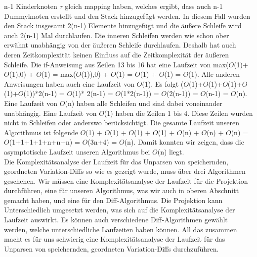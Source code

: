 n-1 Kinderknoten $\tau$ gleich mapping haben, welches ergibt, dass auch n-1 Dummyknoten erstellt und den Stack hinzugefügt werden. In diesem Fall wurden den Stack insgesamt 2(n-1) Elemente hinzugefügt und die äußere Schleife wird auch 2(n-1) Mal durchlaufen. Die inneren Schleifen werden wie schon ober erwähnt unabhängig von der äußeren Schleife durchlaufen. Deshalb hat auch deren Zeitkomplexität keinen Einfluss auf die Zeitkomplexität der äußeren Schleife. Die if-Anweisung aus Zeilen 13 bis 16 hat eine Laufzeit von max($O$(1)+$O$(1),0) + $O$(1) = max($O$(1)),0) + $O$(1) = $O$(1) + $O$(1) = $O$(1). Alle anderen Anweisungen haben auch eine Laufzeit von $O$(1). Es folgt ($O$(1)+$O$(1)+$O$(1)+$O$(1)+$O$(1))*2(n-1) = $O$(1)* 2(n-1) = $O$(1*2(n-1)) = $O$(2(n-1)) = $O$(n-1) = $O$(n). Eine Laufzeit von $O$(n) haben alle Schleifen und sind dabei voneinander unabhängig. Eine Laufzeit von $O$(1) haben die Zeilen 1 bis 4. Diese Zeilen wurden nicht in Schleifen oder anderswo berücksichtigt. Die gesamte Laufzeit unseren Algorithmus ist folgende $O$(1) + $O$(1) + $O$(1) + $O$(1) + $O$(n) + $O$(n) + $O$(n) = $O$(1+1+1+1+n+n+n) = $O$(3n+4) = $O$(n). Damit konnten wir zeigen, dass die asymptotische Laufzeit unseren Algorithmus bei $O$(n) liegt.\\

Die Komplexitätsanalyse der Laufzeit für das Unparsen von speichernden, geordneten Variation-Diffs so wie es gezeigt wurde, muss über drei Algorithmen geschehen. Wir müssen eine Komplexitätsanalyse der Laufzeit für die Projektion durchführen, eine für unseren Algorithmus, was wir auch in oberen Abschnitt gemacht haben, und eine für den Diff-Algorithmus. Die Projektion kann Unterschiedlich umgesetzt werden, was sich auf die Komplexitätsanalyse der Laufzeit auswirkt. Es können auch verschiedene Diff-Algorithmen gewählt werden, welche unterschiedliche Laufzeiten haben können. All das zusammen macht es für uns schwierig eine Komplexitätsanalyse der Laufzeit für das Unparsen von speichernden, geordneten Variation-Diffs durchzuführen. 
















